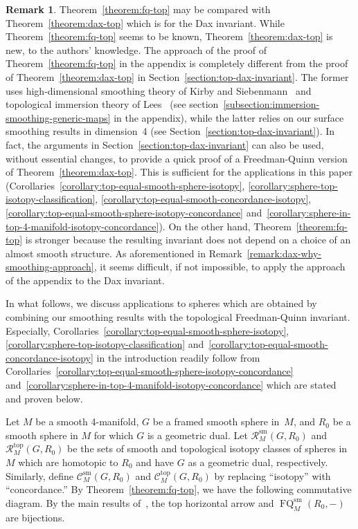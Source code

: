 \documentclass[11pt]{amsart}
\theoremstyle{definition}
\newtheorem{remark}[theorem]{Remark}
\theoremstyle{theorem-giventitle}
\theoremstyle{definition-giventitle}
\numberwithin{equation}{section}
\def\cC{\mathcal{C}}
\def\cR{\mathcal{R}}
\def\sm{\mathrm{sm}}
\def\top{\mathrm{top}}
\def\FQ{\operatorname{FQ}}
\begin{document}
\begin{remark}
  Theorem~\ref{theorem:fq-top} may be compared with Theorem~\ref{theorem:dax-top} which is for the Dax invariant.
  While Theorem~\ref{theorem:fq-top} seems to be known, Theorem~\ref{theorem:dax-top} is new, to the authors' knowledge.
  The approach of the proof of Theorem~\ref{theorem:fq-top} in the appendix is completely different from the proof of Theorem~\ref{theorem:dax-top} in Section~\ref{section:top-dax-invariant}.
  The former uses high-dimensional smoothing theory of Kirby and Siebenmann~\cite{Kirby-Siebenmann:1977-1} and topological immersion theory of Lees~\cite{Lees:1969-1} (see section~\ref{subsection:immersion-smoothing-generic-maps} in the appendix), while the latter relies on our surface smoothing results in dimension~4 (see Section~\ref{section:top-dax-invariant}).
  In fact, the arguments in Section~\ref{section:top-dax-invariant} can also be used, without essential changes, to provide a quick proof of a Freedman-Quinn version of Theorem~\ref{theorem:dax-top}\@.
  This is sufficient for the applications in this paper (Corollaries~\ref{corollary:top-equal-smooth-sphere-isotopy}, \ref{corollary:sphere-top-isotopy-classification}, \ref{corollary:top-equal-smooth-concordance-isotopy}, \ref{corollary:top-equal-smooth-sphere-isotopy-concordance} and~\ref{corollary:sphere-in-top-4-manifold-isotopy-concordance}).
  On the other hand, Theorem~\ref{theorem:fq-top} is stronger because the resulting invariant does not depend on a choice of an almost smooth structure.
  As aforementioned in Remark~\ref{remark:dax-why-smoothing-approach}, it seems difficult, if not impossible, to apply the approach of the appendix to the Dax invariant.
\end{remark}

In what follows, we discuss applications to spheres which are obtained by combining our smoothing results with the topological Freedman-Quinn invariant.
Especially, Corollaries~\ref{corollary:top-equal-smooth-sphere-isotopy}, \ref{corollary:sphere-top-isotopy-classification} and~\ref{corollary:top-equal-smooth-concordance-isotopy} in the introduction readily follow from Corollaries~\ref{corollary:top-equal-smooth-sphere-isotopy-concordance} and~\ref{corollary:sphere-in-top-4-manifold-isotopy-concordance} which are stated and proven below.

Let $M$ be a smooth 4-manifold, $G$ be a framed smooth sphere in~$M$, and $R_0$ be a smooth sphere in $M$ for which $G$ is a geometric dual.
Let $\cR^\sm_M(G,R_0)$ and $\cR^\top_M(G,R_0)$ be the sets of smooth and topological isotopy classes of spheres in $M$ which are homotopic to $R_0$ and have $G$ as a geometric dual, respectively.
Similarly, define $\cC^\sm_M(G,R_0)$ and $\cC^\top_M(G, R_0)$ by replacing ``isotopy'' with ``concordance.''
By Theorem~\ref{theorem:fq-top}, we have the following commutative diagram.
By the main results of~\cite{Schneiderman-Teichner:2022-1}, the top horizontal arrow and $\FQ^\sm_M(R_0,-)$ are bijections.
\end{document}
